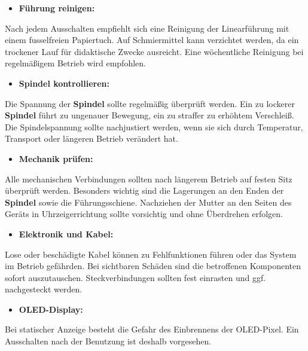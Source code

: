 \documentclass[a4paper,12pt,final]{report}
\begin{document}
\begin{itemize}[leftmargin=1.5em]
	\item \textbf{Führung reinigen:} 
\end{itemize}
Nach jedem Ausschalten empfiehlt sich eine Reinigung der Linearführung mit einem fusselfreien Papiertuch. Auf Schmiermittel kann verzichtet werden, da ein trockener Lauf für didaktische Zwecke ausreicht. Eine wöchentliche Reinigung bei regelmäßigem Betrieb wird empfohlen.

\begin{itemize}[leftmargin=1.5em]		
	\item \textbf{Spindel kontrollieren:} 
\end{itemize}
Die Spannung der \textbf{Spindel} sollte regelmäßig überprüft werden. Ein zu lockerer \textbf{Spindel} führt zu ungenauer Bewegung, ein zu straffer zu erhöhtem Verschleiß. Die Spindelspannung sollte nachjustiert werden, wenn sie sich durch Temperatur, Transport oder längeren Betrieb verändert hat. 

\begin{itemize}[leftmargin=1.5em]		
	\item \textbf{Mechanik prüfen:}  
\end{itemize}
Alle mechanischen Verbindungen sollten nach längerem Betrieb auf festen Sitz überprüft werden. Besonders wichtig sind die Lagerungen an den Enden der \textbf{Spindel} sowie die Führungsschiene. Nachziehen der Mutter an den Seiten des Geräts in Uhrzeigerrichtung sollte vorsichtig und ohne Überdrehen erfolgen.

\begin{itemize}[leftmargin=1.5em]		
	\item \textbf{Elektronik und Kabel:}  
\end{itemize}
Lose oder beschädigte Kabel können zu Fehlfunktionen führen oder das System im Betrieb gefährden. Bei sichtbaren Schäden sind die betroffenen Komponenten sofort auszutauschen. Steckverbindungen sollten fest einrasten und ggf. nachgesteckt werden.

\begin{itemize}[leftmargin=1.5em]		
	\item \textbf{OLED-Display:}  
\end{itemize}
Bei statischer Anzeige besteht die Gefahr des Einbrennens der OLED-Pixel. Ein Ausschalten nach der Benutzung ist deshalb vorgesehen.

\setlength{\leftskip}{0pt} %
\end{document}
